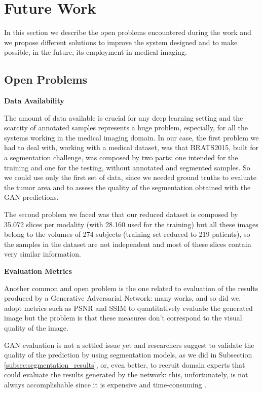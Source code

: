\section{Future Work}
\label{sec:future_work}
In this section we describe the open problems encountered during the work and we propose different solutions to improve the system designed and to make possible, in the future, its employment in medical imaging.

\subsection{Open Problems}
\label{subsec:open_problems}
\noindent\textbf{Data Availability}

\vspace{2mm}
\noindent The amount of data available is crucial for any deep learning setting and the scarcity of annotated samples represents a huge problem, especially, for all the systems working in the medical imaging domain. In our case, the first problem we had to deal with, working with a medical dataset, was that BRATS2015, built for a segmentation challenge, was composed by two parts: one intended for the training and one for the testing, without annotated and segmented samples. So we could use only the first set of data, since we needed ground truths to evaluate the tumor area and to assess the quality of the segmentation obtained with the \ac{GAN} predictions.

The second problem we faced was that our reduced dataset is composed by 35.072 slices per modality (with 28.160 used for the training) but all these images belong to the volumes of 274 subjects (training set reduced to 219 patients), so the samples in the dataset are not independent and most of these slices contain very similar information.

\vspace{6mm} 
\noindent\textbf{Evaluation Metrics}

\vspace{2mm}
\noindent 
Another common and open problem is the one related to evaluation of the results produced by a Generative Adversarial Network: many works, and so did we, adopt metrics such as PSNR and SSIM to quantitatively evaluate the generated image but the problem is that these measures don't correspond to the visual quality of the image. 

GAN evaluation is not a settled issue yet and researchers suggest to validate the quality of the prediction by using segmentation models, as we did in Subsection \ref{subsec:segmentation_results}, or, even better, to recruit domain experts that could evaluate the results generated by the network: this, unfortunately, is not always accomplishable since it is expensive and time-consuming \cite{Yi_2019}.

